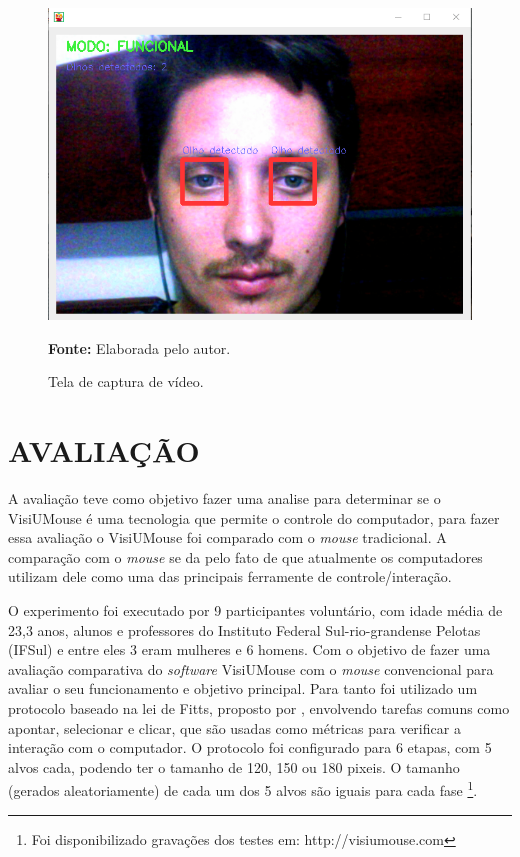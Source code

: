 \begin{figure}[H]
\caption{Tela de captura de vídeo.} 
\centering \includegraphics[scale=.45]{img/visiumouse-tela-captura-video.png}

{\fontsize{11}{11}\selectfont \textbf{Fonte:} Elaborada pelo autor.}
\label{fig:visiumouse-tela-captura-video}
\end{figure}

\chapter{AVALIAÇÃO}\label{CAP7}
A avaliação teve como objetivo fazer uma analise para determinar se o VisiUMouse é uma tecnologia que permite o controle do computador, para fazer essa avaliação o VisiUMouse foi comparado com o \textit{mouse} tradicional. A comparação com o \textit{mouse} se da pelo fato de que atualmente os computadores utilizam dele como uma das principais ferramente de controle/interação.

O experimento foi executado por 9 participantes voluntário, com idade média de 23,3 anos, alunos e professores do Instituto Federal Sul-rio-grandense Pelotas (IFSul) e entre eles 3 eram mulheres e 6 homens. Com o objetivo de fazer uma avaliação comparativa do \textit{software} VisiUMouse com o \textit{mouse} convencional para avaliar o seu funcionamento e objetivo principal. Para tanto foi utilizado um protocolo baseado na lei de Fitts, proposto por , envolvendo tarefas comuns como apontar, selecionar e clicar, que são usadas como métricas para verificar a interação com o computador. O protocolo foi configurado para 6 etapas, com 5 alvos cada, podendo ter o tamanho de 120, 150 ou 180 pixeis. O tamanho (gerados aleatoriamente) de cada um dos 5 alvos são iguais para cada fase \footnote{Foi disponibilizado gravações dos testes em: http://visiumouse.com}.

